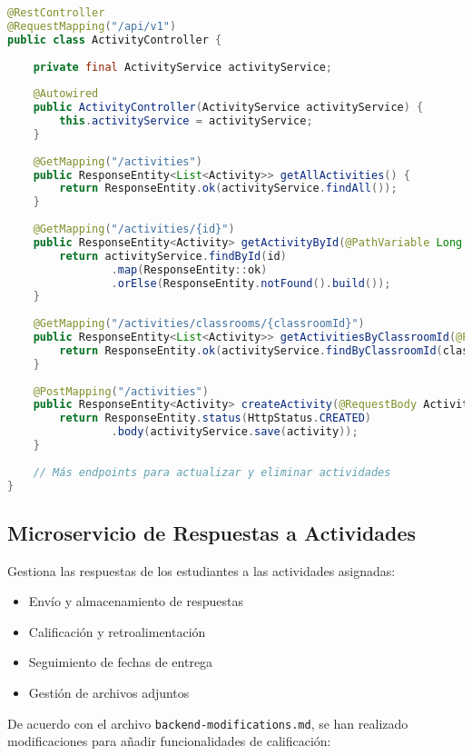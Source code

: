 \documentclass[12pt,a4paper]{report}
\begin{document}
\begin{lstlisting}[language=Java, caption=Controlador de Actividades]
@RestController
@RequestMapping("/api/v1")
public class ActivityController {
    
    private final ActivityService activityService;
    
    @Autowired
    public ActivityController(ActivityService activityService) {
        this.activityService = activityService;
    }
    
    @GetMapping("/activities")
    public ResponseEntity<List<Activity>> getAllActivities() {
        return ResponseEntity.ok(activityService.findAll());
    }
    
    @GetMapping("/activities/{id}")
    public ResponseEntity<Activity> getActivityById(@PathVariable Long id) {
        return activityService.findById(id)
                .map(ResponseEntity::ok)
                .orElse(ResponseEntity.notFound().build());
    }
    
    @GetMapping("/activities/classrooms/{classroomId}")
    public ResponseEntity<List<Activity>> getActivitiesByClassroomId(@PathVariable Long classroomId) {
        return ResponseEntity.ok(activityService.findByClassroomId(classroomId));
    }
    
    @PostMapping("/activities")
    public ResponseEntity<Activity> createActivity(@RequestBody Activity activity) {
        return ResponseEntity.status(HttpStatus.CREATED)
                .body(activityService.save(activity));
    }
    
    // Más endpoints para actualizar y eliminar actividades
}
\end{lstlisting}

\subsection{Microservicio de Respuestas a Actividades}
Gestiona las respuestas de los estudiantes a las actividades asignadas:

\begin{itemize}
    \item Envío y almacenamiento de respuestas
    \item Calificación y retroalimentación
    \item Seguimiento de fechas de entrega
    \item Gestión de archivos adjuntos
\end{itemize}

De acuerdo con el archivo \texttt{backend-modifications.md}, se han realizado modificaciones para añadir funcionalidades de calificación:
\end{document}
